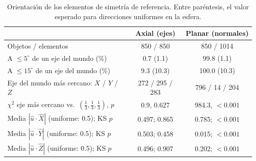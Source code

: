 \begin{table}[htbp]
\centering
\small
\caption{Orientación de los elementos de simetría de referencia. Entre paréntesis, el valor esperado para direcciones uniformes en la esfera.}
\label{tab:orientacion_gt}
\begin{tabular}{lcc}
\toprule
 & Axial (ejes) & Planar (normales) \\
\midrule
Objetos / elementos & 850 / 850 & 850 / 1014 \\
A $\leq 5^\circ$ de un eje del mundo (\%) & 0.7 (1.1) & 99.8 (1.1) \\
A $\leq 15^\circ$ de un eje del mundo (\%) & 9.3 (10.3) & 100.0 (10.3) \\
Eje del mundo más cercano: $X$ / $Y$ / $Z$ & 272 / 295 / 283 & 796 / 14 / 204 \\
$\chi^2$ eje más cercano vs.\ $(\tfrac13,\tfrac13,\tfrac13)$, $p$ & 0.9, 0.627 & 984.3, $<0.001$ \\
Media $|\hat{u}\cdot\hat{X}|$ (uniforme: 0.5); KS $p$ & 0.497; 0.865 & 0.785; $<0.001$ \\
Media $|\hat{u}\cdot\hat{Y}|$ (uniforme: 0.5); KS $p$ & 0.503; 0.458 & 0.015; $<0.001$ \\
Media $|\hat{u}\cdot\hat{Z}|$ (uniforme: 0.5); KS $p$ & 0.496; 0.907 & 0.202; $<0.001$ \\
\bottomrule
\end{tabular}
\end{table}

